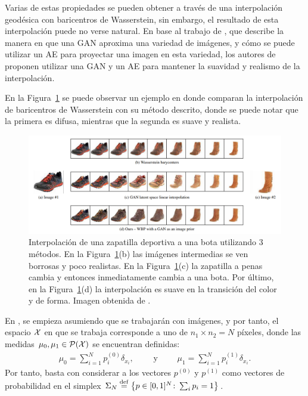 Varias de estas propiedades se pueden obtener a través de una interpolación geodésica con baricentros de Wasserstein, sin embargo, el resultado de esta interpolación puede no verse natural.
En base al trabajo de \cite{zhu2016generative}, que describe la manera en que una GAN aproxima una variedad de imágenes, y cómo se puede utilizar un AE para proyectar una imagen en esta variedad, los autores de \cite{simon2020barycenters} proponen utilizar una GAN y un AE para mantener la suavidad y realismo de la interpolación. 

En la Figura~\ref{fig:interpolacion-wass-bar-gan} se puede observar un ejemplo en donde comparan la interpolación de baricentros de Wasserstein con su método descrito, donde se puede notar que la primera es difusa, mientras que la segunda es suave y realista.
\begin{figure}[H]
    \centering
    \includegraphics[width=\textwidth]{img/cbw/interpolacion-wass-bar-gan.png}
    \caption{
        Interpolación de una zapatilla deportiva a una bota utilizando 3 métodos. En la Figura~\ref{fig:interpolacion-wass-bar-gan}(b) las imágenes intermedias se ven borrosas y poco realistas. En la Figura~\ref{fig:interpolacion-wass-bar-gan}(c) la zapatilla a penas cambia y entonces inmediatamente cambia a una bota. Por último, en la Figura~\ref{fig:interpolacion-wass-bar-gan}(d) la interpolación es suave en la transición del color y de forma. Imagen obtenida de \cite{simon2020barycenters}.
    }
    \label{fig:interpolacion-wass-bar-gan}
\end{figure}

En \cite{simon2020barycenters}, se empieza asumiendo que se trabajarán con imágenes, y por tanto, el espacio $\cX$ en que se trabaja corresponde a uno de $n_1 \times n_2 = N$ píxeles, donde las medidas $\mu_0, \mu_1 \in \ProbSpace[\cX] $ se encuentran definidas:
\begin{align*}
    \mu_0 = \sum_{i=1}^{N} p^{(0)}_i \delta_{x_i},
    \qquad \text{ y } \qquad
    \mu_1 = \sum_{i=1}^{N} p^{(1)}_i \delta_{x_i}.
\end{align*}
Por tanto, basta con considerar a los vectores $p^{(0)}$ y $p^{(1)}$ como vectores de probabilidad en el simplex $\Simplex[N] \eqdef \left\{ p \in [0, 1]^{N} \colon \sum_i p_i = 1 \right\}$.

